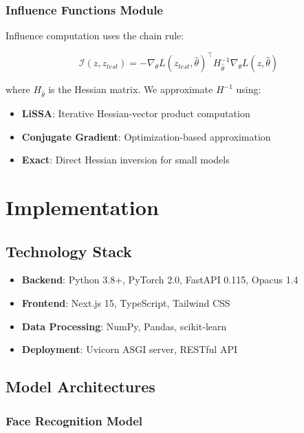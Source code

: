 \documentclass[conference]{IEEEtran}
\begin{document}
\subsubsection{Influence Functions Module}

Influence computation uses the chain rule:

\begin{equation}
    \mathcal{I}(z, z_{test}) = -\nabla_\theta L(z_{test}, \hat{\theta})^\top H_{\hat{\theta}}^{-1} \nabla_\theta L(z, \hat{\theta})
\end{equation}

where $H_{\hat{\theta}}$ is the Hessian matrix. We approximate $H^{-1}$ using:

\begin{itemize}
    \item \textbf{LiSSA}: Iterative Hessian-vector product computation
    \item \textbf{Conjugate Gradient}: Optimization-based approximation
    \item \textbf{Exact}: Direct Hessian inversion for small models
\end{itemize}

\section{Implementation}

\subsection{Technology Stack}

\begin{itemize}
    \item \textbf{Backend}: Python 3.8+, PyTorch 2.0, FastAPI 0.115, Opacus 1.4
    \item \textbf{Frontend}: Next.js 15, TypeScript, Tailwind CSS
    \item \textbf{Data Processing}: NumPy, Pandas, scikit-learn
    \item \textbf{Deployment}: Uvicorn ASGI server, RESTful API
\end{itemize}

\subsection{Model Architectures}

\subsubsection{Face Recognition Model}
\end{document}
